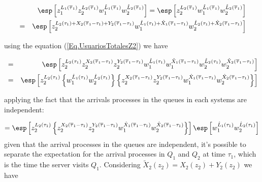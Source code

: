 \begin{eqnarray*}
&&\esp\left[z_{1}^{L_{1}\left(\overline{\tau}_{1}\right)}z_{2}^{L_{2}\left(\overline{\tau}_{1}\right)}w_{1}^{\hat{L}_{1}\left(\overline{\tau}_{1}\right)}w_{2}^{\hat{L}_{2}\left(\overline{\tau}_{1}\right)}\right]
=\esp\left[z_{2}^{L_{2}\left(\overline{\tau}_{1}\right)}w_{1}^{\hat{L}_{1}\left(\overline{\tau}_{1}
\right)}w_{2}^{\hat{L}_{2}\left(\overline{\tau}_{1}\right)}\right]\\
&=&\esp\left[z_{2}^{L_{2}\left(\tau_{1}\right)+X_{2}\left(\overline{\tau}_{1}-\tau_{1}\right)+Y_{2}\left(\overline{\tau}_{1}-\tau_{1}\right)}w_{1}^{\hat{L}_{1}\left(\tau_{1}\right)+\hat{X}_{1}\left(\overline{\tau}_{1}-\tau_{1}\right)}w_{2}^{\hat{L}_{2}\left(\tau_{1}\right)+\hat{X}_{2}\left(\overline{\tau}_{1}-\tau_{1}\right)}\right]
\end{eqnarray*}

using the equation (\ref{Eq.UsuariosTotalesZ2}) we have


\begin{eqnarray*}
&=&\esp\left[z_{2}^{L_{2}\left(\tau_{1}\right)}z_{2}^{X_{2}\left(\overline{\tau}_{1}-\tau_{1}\right)}z_{2}^{Y_{2}\left(\overline{\tau}_{1}-\tau_{1}\right)}w_{1}^{\hat{L}_{1}\left(\tau_{1}\right)}w_{1}^{\hat{X}_{1}\left(\overline{\tau}_{1}-\tau_{1}\right)}w_{2}^{\hat{L}_{2}\left(\tau_{1}\right)}w_{2}^{\hat{X}_{2}\left(\overline{\tau}_{1}-\tau_{1}\right)}\right]\\
&=&\esp\left[z_{2}^{L_{2}\left(\tau_{1}\right)}\left\{w_{1}^{\hat{L}_{1}\left(\tau_{1}\right)}w_{2}^{\hat{L}_{2}\left(\tau_{1}\right)}\right\}\left\{z_{2}^{X_{2}\left(\overline{\tau}_{1}-\tau_{1}\right)}
z_{2}^{Y_{2}\left(\overline{\tau}_{1}-\tau_{1}\right)}w_{1}^{\hat{X}_{1}\left(\overline{\tau}_{1}-\tau_{1}\right)}w_{2}^{\hat{X}_{2}\left(\overline{\tau}_{1}-\tau_{1}\right)}\right\}\right]
\end{eqnarray*}

applying the fact that the arrivals processes in the queues in each systems are independent:

$$=\esp\left[z_{2}^{L_{2}\left(\tau_{1}\right)}\left\{z_{2}^{X_{2}\left(\overline{\tau}_{1}-\tau_{1}\right)}z_{2}^{Y_{2}\left(\overline{\tau}_{1}-
\tau_{1}\right)}w_{1}^{\hat{X}_{1}\left(\overline{\tau}_{1}-\tau_{1}\right)}w_{2}^{\hat{X}_{2}\left(\overline{\tau}_{1}-\tau_{1}\right)}\right\}\right]
\esp\left[w_{1}^{\hat{L}_{1}\left(\tau_{1}\right)}w_{2}^{\hat{L}_{2}\left(\tau_{1}\right)}\right]$$ given that the arrival processes in the queues are independent, it's possible to separate the expectation for the arrival processes in $Q_{1}$ and $Q_{2}$ at time $\tau_{1}$, which is the time the server visits $Q_{1}$. Considering
$\tilde{X}_{2}\left(z_{2}\right)=X_{2}\left(z_{2}\right)+Y_{2}\left(z_{2}\right)$ we have


